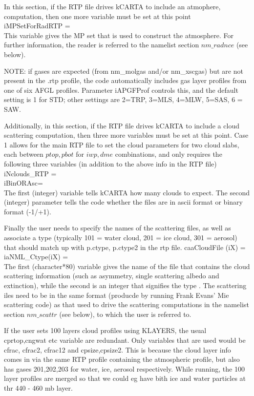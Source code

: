 \documentclass[12pt]{article}
\newcommand{\kc}{\textsf{kCARTA}\xspace}
\newcommand{\ttab}{\indent\indent}
\begin{document}
{In this section, if the RTP file drives \kc to include an atmophere, 
computation, then one more variable must be set at this point \\
{\sf 
\ttab iMPSetForRadRTP = \\
}
This variable gives the MP set that is used to construct the atmosphere. For 
further information, the reader is referred to the namelist section 
$nm\_radnce$  (see below).

NOTE: if gases are expected (from nm\_molgas and/or nm\_xscgas) but are not present
in the .rtp profile, the code automatically includes gas layer profiles from 
one of six AFGL profiles. Parameter iAPGFProf controls this, and the default
setting is 1 for STD; other settings are 2=TRP, 3=MLS, 4=MLW, 5=SAS, 6 = SAW.

Additionally, in this section, if the RTP file drives \kc to include a cloud 
scattering computation, then three more variables must be set at this
point. Case 1 allows for the main RTP file to set the cloud parameters for two
cloud slabs, each between $ptop,pbot$ for $iwp,dme$ combinations, and only
requires the following three variables (in addition to the above info in the
RTP file) \\
{\sf 
\ttab iNclouds\_RTP = \\
\ttab iBinORAsc= \\
}
The first (integer) variable tells kCARTA how many clouds to expect. The second 
(integer) parameter tells the code whether the files are in ascii format or 
binary format (-1/+1). 

Finally the user needs to specify the names of the scattering files, as well
as associate a type (typically 101 = water cloud, 201 = ice cloud, 301 = aerosol)
that should match up with p.ctype, p.ctype2 in the rtp file.
{\sf 
\ttab caaCloudFile (iX) = \\
\ttab iaNML\_Ctype(iX)  = \\
}
The first (character*80) variable gives the name of the file that contains 
the cloud scattering information (such as asymmetry, single scattering albedo 
and extinction), while the second is an integer that signifies the type . The 
scattering iles need to be in 
the same format (producde by running Frank Evans' Mie scattering code) as that
used to drive the scattering computations in the namelist section 
$nm\_scattr$ (see below), to which the user is referred to.

If the user sets 100 layers cloud profiles using KLAYERS, the usual cprtop,cngwat
etc variable are redundant. Only variables that are used would be cfrac, cfrac2,
cfrac12 and cpsize,cpsize2. This is because the cloud layer info comes in via 
the same RTP profile containing the atmospheric profile, but also has gases 
201,202,203 for water, ice, aerosol respectively. While running, the 100 layer
profiles are merged so that we could eg have bith ice and water particles at thr
440 - 460 mb layer.

}
\end{document}
